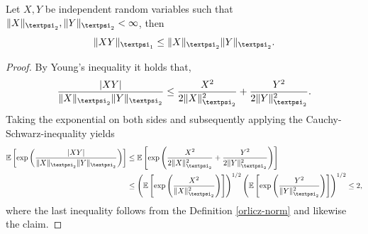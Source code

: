 \documentclass[openany]{book}
\begin{document}
\begin{lemma}\label{prod-orlicz-norm-bound}
    Let $X,Y$ be independent random variables such that $\|X\|_{\gpsi_2}, \|Y\|_{\gpsi_2}< \infty$, then 
    \begin{equation*}
        \|XY\|_{\gpsi_1}\leq \|X\|_{\gpsi_2}\|Y\|_{\gpsi_2}.
    \end{equation*}
    \begin{proof}
        By Young's inequality it holds that,
        \begin{equation*}
            \frac{\vert XY\vert}{\|X\|_{\gpsi_2}\|Y\|_{\gpsi_2}}\leq \frac{X^2}{2\|X\|_{\gpsi_2}^2} +\frac{Y^2}{2\|Y\|_{\gpsi_2}^2}.
        \end{equation*}
        Taking the exponential on both sides and subsequently applying the Cauchy-Schwarz-inequality yields
        \begin{equation*}
        \begin{split}
            \mathbb E\left[\exp\left(\frac{\vert XY\vert}{\|X\|_{\gpsi_2}\|Y\|_{\gpsi_2}}\right)\right]&\leq \mathbb E\left[\exp\left(\frac{X^2}{2\|X\|^2_{\gpsi_2}}+\frac{Y^2}{2\|Y\|^2_{\gpsi_2}}\right)\right]\\&\leq\left( \mathbb E\left[\exp\left(\frac{X^2}{\|X\|^2_{\gpsi_2}}\right)\right]\right)^{1/2}\left( \mathbb E\left[\exp\left(\frac{Y^2}{\|Y\|^2_{\gpsi_2}}\right)\right]\right)^{1/2}\leq 2,
        \end{split}
        \end{equation*}
        where the last inequality follows from the Definition \ref{orlicz-norm} and likewise the claim.
    \end{proof}
\end{lemma}
\end{document}
